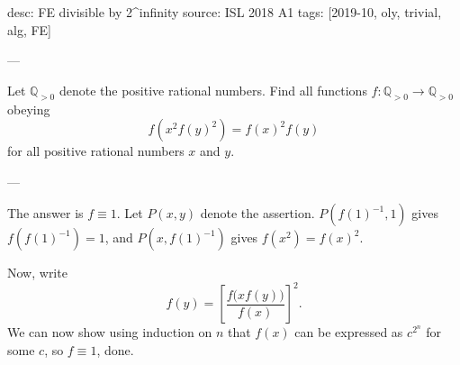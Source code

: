 desc: FE divisible by 2^infinity
source: ISL 2018 A1
tags: [2019-10, oly, trivial, alg, FE]

---

Let $\mathbb Q_{>0}$ denote the positive rational numbers. Find all functions $f:\mathbb Q_{>0}\to\mathbb Q_{>0}$ obeying \[f\left(x^2f(y)^2\right)=f(x)^2f(y)\]
for all positive rational numbers $x$ and $y$.

---

The answer is $f\equiv 1$. Let $P(x,y)$ denote the assertion. $P(f(1)^{-1},1)$ gives $f(f(1)^{-1})=1$, and $P(x,f(1)^{-1})$ gives $f(x^2)=f(x)^2$.

Now, write \[f(y)=\left[\frac{f\big(xf(y)\big)}{f(x)}\right]^2.\]
We can now show using induction on $n$ that $f(x)$ can be expressed as $c^{2^n}$ for some $c$, so $f\equiv 1$, done.
